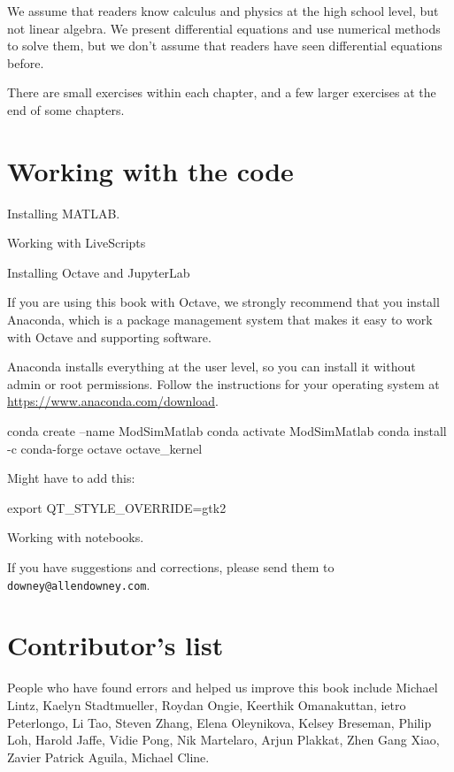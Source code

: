 \documentclass[
]{book}
\numberwithin{Answer}{chapter}
\numberwithin{Exercise}{chapter}
\begin{document}
We assume that readers know calculus and physics at the high school level, but not linear algebra.
We present differential equations and use numerical methods to solve them, but we don't assume that readers have seen differential equations before.

There are small exercises within each chapter, and a few larger
exercises at the end of some chapters.

\section*{Working with the code}

Installing MATLAB.

Working with LiveScripts

Installing Octave and JupyterLab

If you are using this book with Octave, we strongly recommend that you install Anaconda, which is a package management system that makes it easy to work with Octave and supporting software.

Anaconda installs everything at the user level, so you can install it without admin or root permissions.  Follow the instructions for your operating system at \url{https://www.anaconda.com/download}.

\begin{code}
conda create --name ModSimMatlab
conda activate ModSimMatlab
conda install -c conda-forge octave octave_kernel
\end{code}

Might have to add this:

\begin{code}
export QT_STYLE_OVERRIDE=gtk2
\end{code}


Working with notebooks.


If you have suggestions and corrections, please send them to
{\tt downey@allendowney.com}.



\newpage

\section*{Contributor's list}

People who have found errors and helped us improve this book include
Michael Lintz, 
Kaelyn Stadtmueller, 
Roydan Ongie, 
Keerthik Omanakuttan, 
ietro Peterlongo, 
Li Tao, 
Steven Zhang, 
Elena Oleynikova, 
Kelsey Breseman, 
Philip Loh, 
Harold Jaffe, 
Vidie Pong, 
Nik Martelaro, 
Arjun Plakkat, 
Zhen Gang Xiao, 
Zavier Patrick Aguila, 
Michael Cline.
\end{document}
